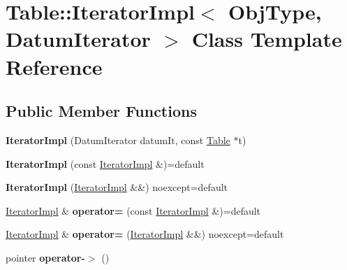 \hypertarget{class_table_1_1_iterator_impl}{}\section{Table\+:\+:Iterator\+Impl$<$ Obj\+Type, Datum\+Iterator $>$ Class Template Reference}
\label{class_table_1_1_iterator_impl}
\subsection*{Public Member Functions}
\begin{DoxyCompactItemize}
\item 
\mbox{\label{class_table_1_1_iterator_impl_aca95ed7c924e645c9526fec5e20355b7}} 
{\bfseries Iterator\+Impl} (Datum\+Iterator datum\+It, const \hyperlink{class_table}{Table} $\ast$t)
\item 
\mbox{\label{class_table_1_1_iterator_impl_a464d27cb3ea841cb34107b88aa2f4cf0}} 
{\bfseries Iterator\+Impl} (const \hyperlink{class_table_1_1_iterator_impl}{Iterator\+Impl} \&)=default
\item 
\mbox{\label{class_table_1_1_iterator_impl_a18a3692b208fbb308e1be54009303ee3}} 
{\bfseries Iterator\+Impl} (\hyperlink{class_table_1_1_iterator_impl}{Iterator\+Impl} \&\&) noexcept=default
\item 
\mbox{\label{class_table_1_1_iterator_impl_ad4614d4c375981c602e7ee857156ef07}} 
\hyperlink{class_table_1_1_iterator_impl}{Iterator\+Impl} \& {\bfseries operator=} (const \hyperlink{class_table_1_1_iterator_impl}{Iterator\+Impl} \&)=default
\item 
\mbox{\label{class_table_1_1_iterator_impl_ac33032203b7058566e732a5d3648254f}} 
\hyperlink{class_table_1_1_iterator_impl}{Iterator\+Impl} \& {\bfseries operator=} (\hyperlink{class_table_1_1_iterator_impl}{Iterator\+Impl} \&\&) noexcept=default
\item 
\mbox{\label{class_table_1_1_iterator_impl_a501bb4348969547c67c2e6a13a042ac8}} 
pointer {\bfseries operator-\/$>$} ()

\end{DoxyCompactItemize}
